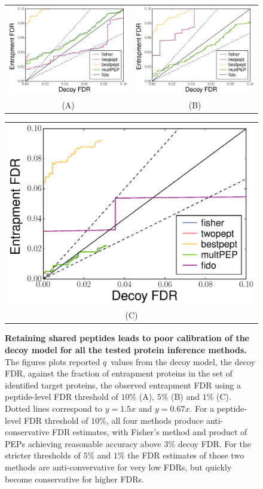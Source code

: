 \documentclass{article}
\begin{document}
\begin{figure}
\begin{center}
\begin{tabular}{cc} 
\includegraphics[width=0.45\linewidth]
  {./img/shared-pept-accuracy-fdr10-with-fido} &
\includegraphics[width=0.45\linewidth]
  {./img/shared-pept-accuracy-fdr5-with-fido}\\
 (A) & (B) 
\end{tabular}
\begin{tabular}{c} 
\includegraphics[width=0.45\linewidth]
  {./img/shared-pept-accuracy-fdr1-with-fido}\\
(C)
\end{tabular}
\caption{\label{fig:shared-accuracy}\textbf{Retaining shared peptides
leads to poor calibration of the decoy model for all the tested
protein inference methods.} The figures plots reported $q$~values from
the decoy model, the decoy FDR, against the fraction of entrapment
proteins in the set of identified target proteins, the observed
entrapment FDR using a peptide-level FDR threshold of $10\%$ (A),
$5\%$ (B) and $1\%$ (C). Dotted lines correspond to $y=1.5x$ and
$y=0.67x$.  For a peptide-level FDR threshold of $10\%$, all four
methods produce anti-conservative FDR estimates, with Fisher's method
and product of PEPs achieving reasonable accuracy above $3\%$ decoy
FDR. For the stricter thresholds of $5\%$ and $1\%$ the FDR estimates
of those two methods are anti-convervative for very low FDRs, but
quickly become conservative for higher FDRs.}
\end{center}
\end{figure}
\end{document}
